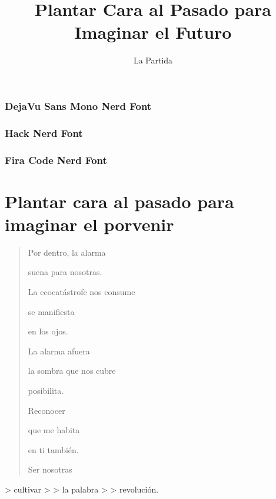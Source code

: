 \documentclass{Tiqqunazo}
\title{Plantar Cara al Pasado para Imaginar el Futuro} %
\author{La Partida} %
\begin{document}
\begingroup
\fontsize{8}{10}\DejaRegular
\section*{DejaVu Sans Mono Nerd Font}
\lipsum[1]

\fontsize{8}{10}\HackRegular
\section*{Hack Nerd Font}
\lipsum[1]

\fontsize{8}{10}\FiraRegular
\section*{Fira Code Nerd Font}
\lipsum[1]

\clearpage

\fontsize{8}{10}\FiraRegular
\begin{quotation}

\end{quotation}
\endgroup


\clearpage

\tableofcontents

\clearpage

\part{Plantar cara al pasado para imaginar el porvenir}

\begin{verse}
    Por dentro, la alarma
    
    suena para nosotras.
    
    La ecocatástrofe nos consume
    
    se manifiesta
    
    en los ojos.
    
    La alarma afuera
    
    la sombra que nos cubre
    
    posibilita.
    
    Reconocer
    
    que me habita
    
    en ti también.
    
    Ser nosotras
    \end{verse}
    
    \bigskip
    
    \begin{markdown}
    > cultivar
    >
    > la palabra
    >
    > revolución.
\end{markdown}
\end{document}
